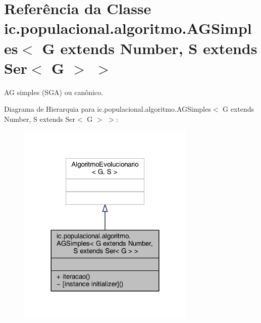 \hypertarget{classic_1_1populacional_1_1algoritmo_1_1_a_g_simples_3_01_g_01extends_01_number_00_01_s_01extends_01_ser_3_01_g_01_4_01_4}{\section{Referência da Classe ic.\-populacional.\-algoritmo.\-A\-G\-Simples$<$ G extends Number, S extends Ser$<$ G $>$ $>$}
\label{classic_1_1populacional_1_1algoritmo_1_1_a_g_simples_3_01_g_01extends_01_number_00_01_s_01extends_01_ser_3_01_g_01_4_01_4}
}


A\-G simples (S\-G\-A) ou canônico.  




Diagrama de Hierarquia para ic.\-populacional.\-algoritmo.\-A\-G\-Simples$<$ G extends Number, S extends Ser$<$ G $>$ $>$\-:\nopagebreak
\begin{figure}[H]
\begin{center}
\leavevmode
\includegraphics[width=240pt]{classic_1_1populacional_1_1algoritmo_1_1_a_g_simples_3_01_g_01extends_01_number_00_01_s_01extendd8a60c4fa04f06ecda1afb85fb6c2386}
\end{center}
\end{figure}


